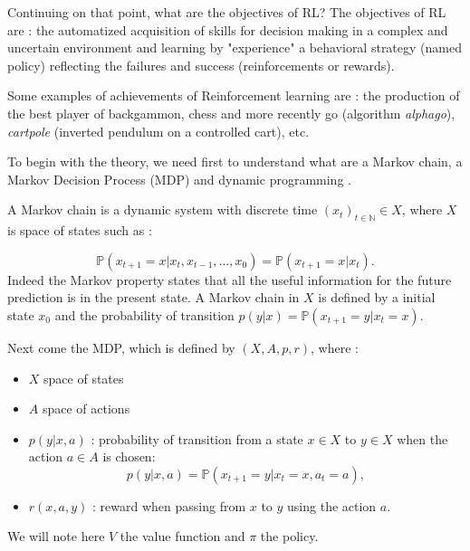 \documentclass[conference]{IEEEtran}
\begin{document}
Continuing on that point, what are the objectives of RL?
The objectives of RL are : the automatized acquisition of skills for decision making in a complex and uncertain environment and learning by "experience" a behavioral strategy (named policy) reflecting the failures and success (reinforcements or rewards).

Some examples of achievements of Reinforcement learning are : the production of the best player of backgammon, chess and more recently go (algorithm \textit{alphago}), \textit{cartpole} (inverted pendulum on a controlled cart), etc.

To begin with the theory, we need first to understand what are a Markov chain, a Markov Decision Process (MDP) and dynamic programming \cite{MUNOS1}.

A Markov chain is a dynamic system with discrete time $(x_t)_{t\in\mathbb{N}} \in X$, where $X$ is space of states such as :

\begin{equation*}
\mathbb{P}(x_{t+1}=x|x_t,x_{t-1},...,x_0)=\mathbb{P}(x_{t+1}=x|x_t).
\end{equation*}
Indeed the Markov property states that all the useful information for the future prediction is in the present state. 
A Markov chain in $X$ is defined by a initial state $x_0$ and the probability of transition $p(y|x)=\mathbb{P}(x_{t+1}=y|x_t=x)$.

Next come the MDP, which is defined by $(X,A,p,r)$, where :
\begin{itemize}
 \item $X$ space of states
 \item $A$ space of actions
 \item $p(y|x,a)$ : probability of transition from a state $x \in X$ to $y \in X$ when the action $a \in A$ is chosen:
 \begin{equation*}
 p(y|x,a) = \mathbb{P}(x_{t+1}=y|x_t=x,a_t=a),
 \end{equation*}
 \item $r(x,a,y)$ : reward when passing from $x$ to $y$ using the action $a$.
\end{itemize}
We will note here $V$ the value function and $\pi$ the policy.\\
\end{document}
